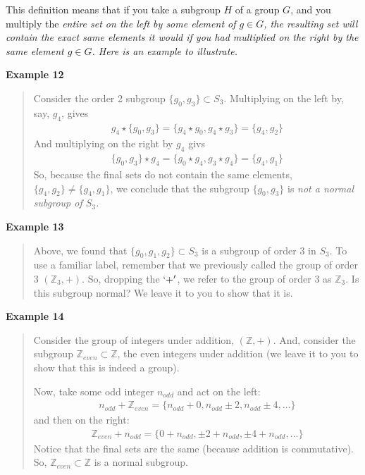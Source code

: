 \documentclass[12pt,epsf]{article}
\def\nolabel{\nonumber }
\def\nolabel{\nonumber }
\begin{document}
This definition means that if you take a subgroup $H$ of a group $G$,
and you multiply the \it entire set \rm on the left by some element of
$g\in G$, the resulting set will contain the exact same elements it
would if you had multiplied \it on the right \rm by the same element $g
\in G$.  Here is an example to illustrate.  

\bf Example 12 \rm
\vspace*{-2ex}
\begin{quote}
Consider the order 2 subgroup $\{g_0,g_3\}\subset
S_3$.  Multiplying on the left by, say, $g_4$, gives 
\begin{eqnarray}
g_4 \star \{g_0,g_3\} = \{g_4 \star g_0,g_4\star g_3\} = \{g_4,g_2\}
\nolabel 
\end{eqnarray}
And multiplying on the right by $g_4$ givs
\begin{eqnarray}
\{g_0,g_3\} \star g_4 = \{g_0 \star g_4, g_3 \star g_4\} = \{g_4,g_1\}
\nolabel 
\end{eqnarray}
So, because the final sets do not contain the same elements, $\{g_4,
g_2\} \neq \{g_4,g_1\}$, we conclude that the subgroup $\{g_0,g_3\}$ is
\it not \rm a normal subgroup of $S_3$.  
\end{quote}

\bf Example 13 \rm
\vspace*{-2ex}
\begin{quote}
Above, we found that $\{g_0,g_1,g_2\}\subset S_3$ is
a subgroup of order 3 in $S_3$.  To use a familiar label, remember that
we previously called the group of order 3 $(\mathbb{Z}_3,+)$.  So,
dropping the $`+'$, we refer to the group of order 3 as
$\mathbb{Z}_3$.  Is this subgroup normal?  We leave it to you to show
that it is.	
\end{quote}
\bf Example 14 \rm
\vspace*{-2ex}
\begin{quote}
Consider the group of integers under addition,
$(\mathbb{Z},+)$.  And, consider the subgroup $\mathbb{Z}_{even}
\subset \mathbb{Z}$, the even integers under addition (we leave it to
you to show that this is indeed a group).  

Now, take some odd integer $n_{odd}$ and act on the left:
\begin{eqnarray}
n_{odd} + \mathbb{Z}_{even} = \{n_{odd} + 0, n_{odd}\pm 2,n_{odd}\pm 4,
\ldots\} \nolabel 
\end{eqnarray}
and then on the right:
\begin{eqnarray}
\mathbb{Z}_{even} + n_{odd} = \{0 + n_{odd}, \pm 2 + n_{odd}, \pm 4 +
n_{odd},\ldots\} \nolabel 
\end{eqnarray}
Notice that the final sets are the same (because addition is
commutative).  So, $\mathbb{Z}_{even} \subset \mathbb{Z}$ is a normal
subgroup.
\end{quote} 
\end{document}
